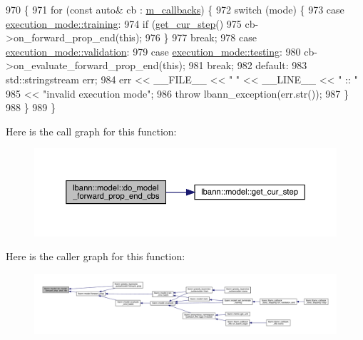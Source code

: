 \begin{DoxyCode}
970                                                              \{
971   \textcolor{keywordflow}{for} (\textcolor{keyword}{const} \textcolor{keyword}{auto}& cb : \hyperlink{classlbann_1_1model_a07b511fef30368494c2ad80922ffd0eb}{m\_callbacks}) \{
972     \textcolor{keywordflow}{switch} (mode) \{
973     \textcolor{keywordflow}{case} \hyperlink{base_8hpp_a2781a159088df64ed7d47cc91c4dc0a8ac185ddac8b5a8f5aa23c5b80bc12d214}{execution\_mode::training}:
974       \textcolor{keywordflow}{if} (\hyperlink{classlbann_1_1model_ad0cdcba177434b52dc9c4a97be183a92}{get\_cur\_step}() %
975         cb->on\_forward\_prop\_end(\textcolor{keyword}{this});
976       \}
977       \textcolor{keywordflow}{break};
978     \textcolor{keywordflow}{case} \hyperlink{base_8hpp_a2781a159088df64ed7d47cc91c4dc0a8aa617908b172c473cb8e8cda059e55bf0}{execution\_mode::validation}:
979     \textcolor{keywordflow}{case} \hyperlink{base_8hpp_a2781a159088df64ed7d47cc91c4dc0a8aae2b1fca515949e5d54fb22b8ed95575}{execution\_mode::testing}:
980       cb->on\_evaluate\_forward\_prop\_end(\textcolor{keyword}{this});
981       \textcolor{keywordflow}{break};
982     \textcolor{keywordflow}{default}:
983       std::stringstream err;
984       err << \_\_FILE\_\_ << \textcolor{stringliteral}{" "} << \_\_LINE\_\_ << \textcolor{stringliteral}{" :: "}
985           << \textcolor{stringliteral}{"invalid execution mode"};
986       \textcolor{keywordflow}{throw} lbann\_exception(err.str());
987     \}
988   \}
989 \}
\end{DoxyCode}
Here is the call graph for this function\+:\nopagebreak
\begin{figure}[H]
\begin{center}
\leavevmode
\includegraphics[width=350pt]{classlbann_1_1model_a9d67f4f3a027327d2db8767759f9c2bf_cgraph}
\end{center}
\end{figure}
Here is the caller graph for this function\+:\nopagebreak
\begin{figure}[H]
\begin{center}
\leavevmode
\includegraphics[width=350pt]{classlbann_1_1model_a9d67f4f3a027327d2db8767759f9c2bf_icgraph}
\end{center}
\end{figure}
